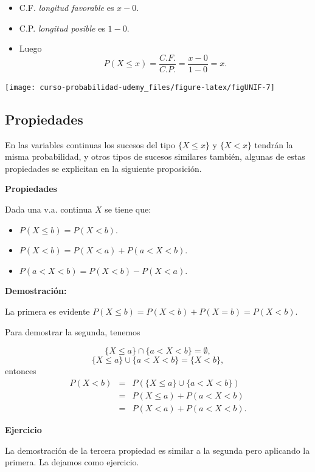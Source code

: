 \documentclass[]{book}
\providecommand{\tightlist}{%
  \setlength{\itemsep}{0pt}\setlength{\parskip}{0pt}}
\begin{document}
\begin{itemize}
\tightlist
\item
  C.F. \emph{longitud favorable} es \(x-0\).
\item
  C.P. \emph{longitud posible} es \(1-0\).
\item
  Luego
  \[P(X\leq x)=\frac{C.F.}{C.P.}=\frac{x-0}{1-0}=x.\]
\end{itemize}

\begin{center}\texttt{[image: curso-probabilidad-udemy\_files/figure-latex/figUNIF-7]} \end{center}

\hypertarget{propiedades-3}{%
\subsection{Propiedades}\label{propiedades-3}}

En las variables continuas los sucesos del tipo \(\{X\leq x \}\) y \(\{X< x \}\) tendrán la
misma probabilidad, y otros tipos de sucesos similares también, algunas de estas
propiedades se explicitan en la siguiente proposición.

\textbf{Propiedades}

Dada una v.a. continua \(X\) se tiene que:

\begin{itemize}
\tightlist
\item
  \(P(X\leq b)=P(X<b)\).
\item
  \(P(X<b)=P(X<a)+P(a<X<b)\).
\item
  \(P(a<X<b)=P(X<b)-P(X<a)\).
\end{itemize}

\textbf{Demostración:}

La primera es evidente \(P(X\leq b)=P(X<b)+P(X=b)=P(X<b)\).

Para demostrar la segunda, tenemos

\[\{X\leq a\}\cap \{a<X<b\}=\emptyset,\]
\[\{X\leq a\}\cup \{a<X<b\}=\{X<b\},\]
entonces
\begin{eqnarray*}
P(X< b) & = & P(\{X\leq a\}\cup \{a<X<b\})\\
& = & P(X\leq a)+P(a<X<b) \\
& = & P(X< a)+P(a<X<b).
\end{eqnarray*}

\textbf{Ejercicio}

La demostración de la tercera propiedad es similar a la segunda pero aplicando la primera. La dejamos como ejercicio.
\end{document}
